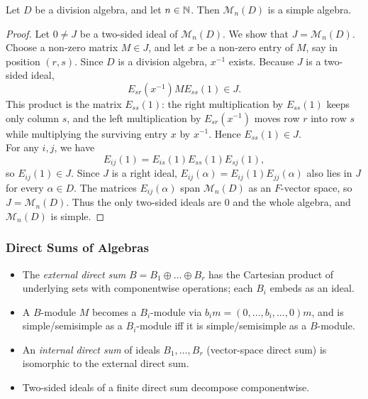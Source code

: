 \documentclass[../Odyssey_Project.tex]{subfiles}
\begin{document}
\begin{theorem}
\label{thm:13.8}
Let $D$ be a division algebra, and let $n \in \mathbb{N}$. Then $\mathcal{M}_n(D)$ is a simple algebra.
\end{theorem}
\begin{proof}
    Let $0 \neq J$ be a two-sided ideal of $\mathcal{M}_n(D)$. We show that $J = \mathcal{M}_n(D)$. Choose a non-zero matrix $M \in J$, and let $x$ be a non-zero entry of $M$, say in position $(r,s)$. Since $D$ is a division algebra, $x^{-1}$ exists. Because $J$ is a two-sided ideal,
    \[
        E_{sr}(x^{-1}) M E_{ss}(1) \in J.
    \]
    This product is the matrix $E_{ss}(1)$: the right multiplication by $E_{ss}(1)$ keeps only column $s$, and the left multiplication by $E_{sr}(x^{-1})$ moves row $r$ into row $s$ while multiplying the surviving entry $x$ by $x^{-1}$. Hence $E_{ss}(1) \in J$.\\
    For any $i,j$, we have
    \[
        E_{ij}(1) = E_{is}(1)E_{ss}(1)E_{sj}(1),
    \]
    so $E_{ij}(1) \in J$. Since $J$ is a right ideal, $E_{ij}(\alpha) = E_{ij}(1)E_{jj}(\alpha)$ also lies in $J$ for every $\alpha \in D$. The matrices $E_{ij}(\alpha)$ span $\mathcal{M}_n(D)$ as an $F$-vector space, so $J = \mathcal{M}_n(D)$. Thus the only two-sided ideals are $0$ and the whole algebra, and $\mathcal{M}_n(D)$ is simple.
\end{proof}

\subsubsection*{Direct Sums of Algebras}
\begin{itemize}
    \item The \emph{external direct sum} $B = B_1 \oplus \dots \oplus B_r$ has the Cartesian product of underlying sets with componentwise operations; each $B_i$ embeds as an ideal.
    \item A $B$-module $M$ becomes a $B_i$-module via $b_i m = (0,\dots,b_i,\dots,0) m$, and is simple/semisimple as a $B_i$-module iff it is simple/semisimple as a $B$-module.
    \item An \emph{internal direct sum} of ideals $B_1, \dots, B_r$ (vector-space direct sum) is isomorphic to the external direct sum.
    \item Two-sided ideals of a finite direct sum decompose componentwise.
\end{itemize}
\end{document}
